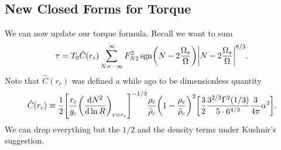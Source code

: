\documentclass[11pt,
        usenames, %
        dvipsnames %
    ]{article}
\newcommand*{\rd}[2]{\frac{\mathrm{d}#1}{\mathrm{d}#2}}
\DeclareMathOperator{\sgn}{sgn}
\DeclarePairedDelimiter\abs{\lvert}{\rvert}
\DeclarePairedDelimiter\p{\lparen}{\rparen}
\DeclarePairedDelimiter\s{\lbrack}{\rbrack}
\begin{document}


\subsection{New Closed Forms for Torque}

We can now update our torque formula. Recall we want to sum
\begin{equation}
    \tau = T_0 \hat{C}(r_c)
            \sum\limits_{N = -\infty}^\infty
                F_{N2}^2 \sgn\p*{N - 2\frac{\Omega_s}{\Omega}}
                    \abs*{N - 2\frac{\Omega_s}{\Omega}}^{8/3}.
\end{equation}
Note that $\hat{C}(r_c)$ was defined a while ago to be dimensionless quantity
\begin{equation}
    \hat{C}(r_c) \equiv \frac{1}{2}
        \s*{\frac{r_c}{g_c}\p*{\rd{N^2}{\ln R}}_{r = r_c}}^{-1/3}
            \frac{\rho_c}{\bar{\rho}_c} \p*{1 - \frac{\rho_c}{\bar{\rho}_c}}^2
            \s*{\frac{3}{2}\frac{3^{2/3}\Gamma^2(1/3)}{5 \cdot
                6^{4/3}} \frac{3}{4\pi}\alpha^2}.
\end{equation}
We can drop everything but the $1/2$ and the density terms under Kushnir's
suggestion.
\end{document}
